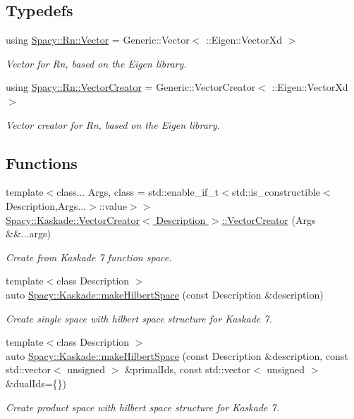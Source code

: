 \subsection*{Typedefs}
\begin{DoxyCompactItemize}
\item 
using \hyperlink{group__VectorSpaceGroup_gafda42fd5aa3f7597a42b9831bf4dfd07}{Spacy\+::\+Rn\+::\+Vector} = Generic\+::\+Vector$<$ \+::Eigen\+::\+Vector\+Xd $>$
\begin{DoxyCompactList}\small\item\em Vector for Rn, based on the Eigen library. \end{DoxyCompactList}\item 
using \hyperlink{group__VectorSpaceGroup_gab3b27cb653ec69d12c809394126b046a}{Spacy\+::\+Rn\+::\+Vector\+Creator} = Generic\+::\+Vector\+Creator$<$ \+::Eigen\+::\+Vector\+Xd $>$
\begin{DoxyCompactList}\small\item\em Vector creator for Rn, based on the Eigen library. \end{DoxyCompactList}\end{DoxyCompactItemize}
\subsection*{Functions}
\begin{DoxyCompactItemize}
\item 
{\footnotesize template$<$class... Args, class  = std\+::enable\+\_\+if\+\_\+t$<$std\+::is\+\_\+constructible$<$\+Description,\+Args...$>$\+::value$>$$>$ }\\\hyperlink{group__VectorSpaceGroup_ga89de372343310640870077e6167df3f4}{Spacy\+::\+Kaskade\+::\+Vector\+Creator$<$ Description $>$\+::\+Vector\+Creator} (Args \&\&...args)
\begin{DoxyCompactList}\small\item\em Create from Kaskade 7 function space. \end{DoxyCompactList}\item 
{\footnotesize template$<$class Description $>$ }\\auto \hyperlink{group__VectorSpaceGroup_ga04d45446864bbf87770d02eade7b64cf}{Spacy\+::\+Kaskade\+::make\+Hilbert\+Space} (const Description \&description)
\begin{DoxyCompactList}\small\item\em Create single space with hilbert space structure for Kaskade 7. \end{DoxyCompactList}\item 
{\footnotesize template$<$class Description $>$ }\\auto \hyperlink{group__VectorSpaceGroup_ga221db25c41371a2a823a6b569d735ef6}{Spacy\+::\+Kaskade\+::make\+Hilbert\+Space} (const Description \&description, const std\+::vector$<$ unsigned $>$ \&primal\+Ids, const std\+::vector$<$ unsigned $>$ \&dual\+Ids=\{\})
\begin{DoxyCompactList}\small\item\em Create product space with hilbert space structure for Kaskade 7. \end{DoxyCompactList}\end{DoxyCompactItemize}



